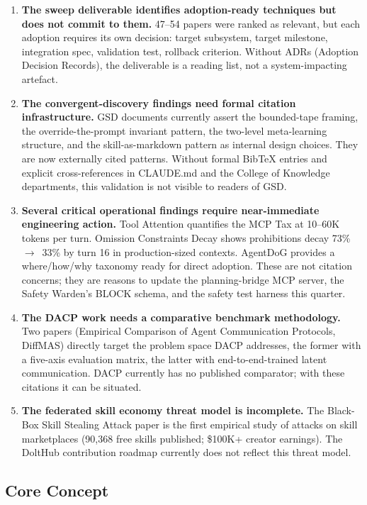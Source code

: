 \documentclass[11pt,letterpaper]{article}
\begin{document}
\begin{enumerate}[leftmargin=*]
\item \textbf{The sweep deliverable identifies adoption-ready techniques but does not commit to them.} 47--54 papers were ranked as relevant, but each adoption requires its own decision: target subsystem, target milestone, integration spec, validation test, rollback criterion. Without ADRs (Adoption Decision Records), the deliverable is a reading list, not a system-impacting artefact.
\item \textbf{The convergent-discovery findings need formal citation infrastructure.} GSD documents currently assert the bounded-tape framing, the override-the-prompt invariant pattern, the two-level meta-learning structure, and the skill-as-markdown pattern as internal design choices. They are now externally cited patterns. Without formal BibTeX entries and explicit cross-references in CLAUDE.md and the College of Knowledge departments, this validation is not visible to readers of GSD.
\item \textbf{Several critical operational findings require near-immediate engineering action.} Tool Attention quantifies the MCP Tax at 10--60K tokens per turn. Omission Constraints Decay shows prohibitions decay 73\%~$\rightarrow$~33\% by turn 16 in production-sized contexts. AgentDoG provides a where/how/why taxonomy ready for direct adoption. These are not citation concerns; they are reasons to update the planning-bridge MCP server, the Safety Warden's BLOCK schema, and the safety test harness this quarter.
\item \textbf{The DACP work needs a comparative benchmark methodology.} Two papers (Empirical Comparison of Agent Communication Protocols, DiffMAS) directly target the problem space DACP addresses, the former with a five-axis evaluation matrix, the latter with end-to-end-trained latent communication. DACP currently has no published comparator; with these citations it can be situated.
\item \textbf{The federated skill economy threat model is incomplete.} The Black-Box Skill Stealing Attack paper is the first empirical study of attacks on skill marketplaces (90,368 free skills published; \$100K+ creator earnings). The DoltHub contribution roadmap currently does not reflect this threat model.
\end{enumerate}

\subsection{Core Concept}
\end{document}
